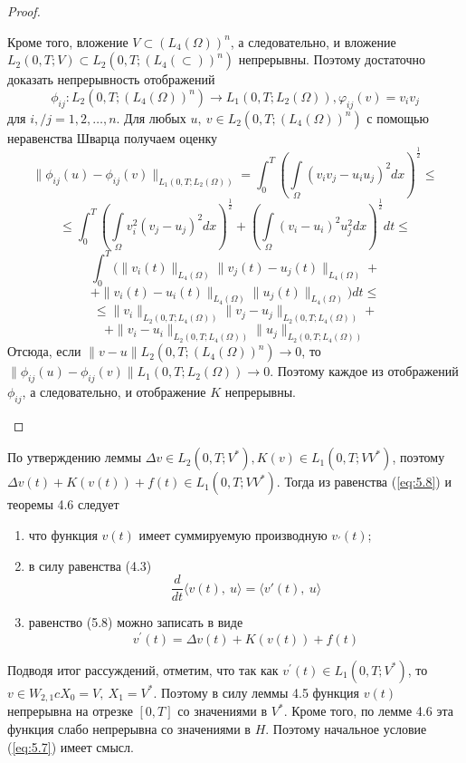 \begin{proof}
\begin{enumerate}
        Кроме того, вложение $V \subset (L_4(\Omega))^n$, а следовательно, и вложение $L_2(0, T; V) \subset L_2(0, T; (L_4(\subset))^n)$
        непрерывны. Поэтому достаточно доказать непрерывность отображений
        $$\phi_{ij}: L_2(0, T; (L_4(\Omega))^n) \rightarrow L_1(0, T; L_2(\Omega)), \varphi_{ij}(v) = v_i v_j$$
        для $i, / j = 1, 2, \dots, n$.
        Для любых $u, \ v \in L_2(0, T; (L_4(\Omega))^n)$ с помощью неравенства Шварца получаем оценку
        $$\parallel\phi_{ij}(u)-\phi_{ij}(v)\parallel_{L_1(0, T; L_2(\Omega))}=\int_0^T(\int\limits_\Omega(v_iv_j-u_iu_j)^2dx)^\frac{1}{2}\le$$
        $$\le\int_0^T(\int\limits_\Omega v_i^2(v_j-u_j)^2dx)^\frac{1}{2}+(\int\limits_\Omega (v_i-u_i)^2u_j^2dx)^\frac{1}{2}dt\le$$
        $$\int_0^T(\parallel v_i(t)\parallel_{L_4(\Omega)}\parallel v_j(t)-u_j(t)\parallel_{L_4(\Omega)}+$$
        $$+\parallel v_i(t)-u_i(t)\parallel_{L_4(\Omega)}\parallel u_j(t)\parallel_{L_4(\Omega)})dt\le$$
        $$\le\parallel v_i\parallel_{L_2(0, T; L_4(\Omega))}\parallel v_j-u_j\parallel_{L_2(0, T; L_4(\Omega))}+$$
        $$+\parallel v_i-u_i\parallel_{L_2(0, T; L_4(\Omega))}\parallel u_j\parallel_{L_2(0, T; L_4(\Omega))}$$
        Отсюда, если
        $\parallel v - u \parallel L_2(0, T; (L_4(\Omega))^n) \rightarrow 0$,
        то $\parallel \phi_{ij}(u) - \phi_{ij}(v) \parallel L_1(0, T; L_2(\Omega)) \rightarrow 0$.
        Поэтому каждое из отображений $\phi_{ij}$, а следовательно, и отображение $K$ непрерывны.
    \end{enumerate}
\end{proof}

По утверждению леммы $\Delta v \in L_2(0, T; V^\ast), K(v) \in L_1(0, T; VV^\ast)$, поэтому $\Delta v(t) + K(v(t)) + f(t) \in L_1(0, T; VV^\ast)$.
Тогда из равенства (\ref{eq:5.8}) и теоремы 4.6 следует
\begin{enumerate}
    \item что функция $v(t)$ имеет суммируемую производную $v_\prime(t)$;
    \item в силу равенства (4.3)
    $$\frac{d}{dt} \langle v(t), \ u \rangle = \langle v'(t), \ u \rangle $$
    \item равенство (5.8) можно записать в виде
    $$v^\prime(t)=\Delta v(t)+K(v(t))+f(t)$$
\end{enumerate}

Подводя итог рассуждений, отметим, что так как $v^\prime(t) \in L_1(0, T; V^\ast)$, то $v \in W_{2, 1} c X_0 = V, \ X_1 = V^\ast$. Поэтому в силу леммы 4.5 функция
$v(t)$ непрерывна на отрезке $[0, T]$ со значениями в $V^\ast$. Кроме того, по лемме 4.6 эта функция слабо непрерывна со значениями в $H$. Поэтому
начальное условие (\ref{eq:5.7}) имеет смысл.

